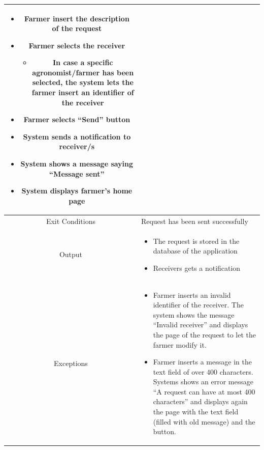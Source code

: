 \documentclass{article}
\begin{document}
\begin{center}
\begin{longtable}{|c| p{10cm}|}
\begin{itemize}
                                \item Farmer insert the description of the request
                                \item Farmer selects the receiver
                                        \begin{itemize}
                                            \item In case a specific agronomist/farmer has been selected, the system lets the farmer insert an identifier of the receiver
                                        \end{itemize}
                                \item Farmer selects “Send” button
                                \item System sends a notification to receiver/s
                                \item System shows a message saying “Message sent” 
                                \item System displays farmer’s home page
                            \end{itemize} \\
        \hline
            Exit Conditions & Request has been sent successfully\\
        \hline
            Output &    \begin{itemize}
                            \item The request is stored in the database of the application
                            \item Receivers gets a notification
                        \end{itemize}\\
        \hline
            Exceptions &    \begin{itemize}
                                \item Farmer inserts an invalid identifier of the receiver. The system shows the message “Invalid receiver” and displays the page of the request to let the farmer modify it.
                                \item Farmer inserts a message in the text field of over 400 characters. Systems shows an error message “A request can have at most 400 characters” and displays again the page with the text field (filled with old message) and the button.
                            \end{itemize} \\
        \hline
    \end{longtable}
    

\end{center}
\end{document}
